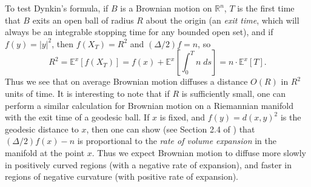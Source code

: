 \documentclass[12pt]{article}
\newcommand*{\R}{\mathbb{R}}
\begin{document}
%
To test Dynkin's formula, if $B$ is a Brownian motion on $\R^n$, $T$ is the first time that $B$ exits an open ball of radius $R$ about the origin (an \emph{exit time}, which will always be an integrable stopping time for any bounded open set), and if $f(y) = |y|^2$, then $f(X_T) = R^2$ and $(\Delta/2) f = n$, so
%
\[ R^2 = \mathbb{E}^x[f(X_T)] = f(x) + \mathbb{E}^x \left[ \int_0^T n\; ds \right] = n \cdot \mathbb{E}^x[T]. \]
%
Thus we see that on average Brownian motion diffuses a distance $O(R)$ in $R^2$ units of time. It is interesting to note that if $R$ is sufficiently small, one can perform a similar calculation for Brownian motion on a Riemannian manifold with the exit time of a geodesic ball. If $x$ is fixed, and $f(y) = d(x,y)^2$ is the geodesic distance to $x$, then one can show (see Section 2.4 of \cite{rosenberg}) that $(\Delta/2) f(x) - n$ is proportional to the \emph{rate of volume expansion} in the manifold at the point $x$.
Thus we expect Brownian motion to diffuse more slowly in positively curved regions (with a negative rate of expansion), and faster in regions of negative curvature (with positive rate of expansion).
\end{document}
